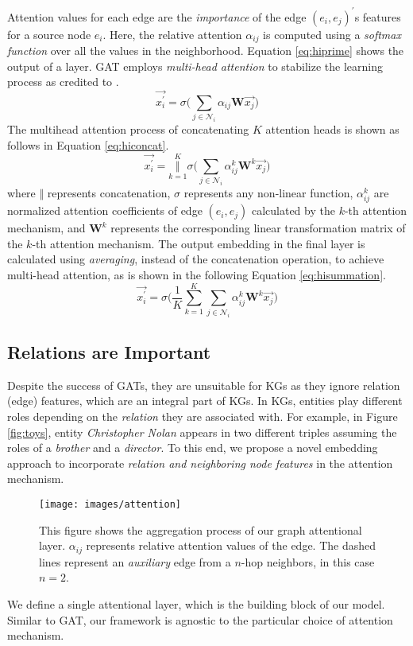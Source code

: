 \documentclass[11pt,a4paper]{article}
\begin{document}
Attention values for each edge are the \textit{importance} of the edge \((e_i, e_j)^{'}\)s features for a source node \(e_i\). Here, the relative attention \(\alpha_{ij}\) is computed using a \emph{softmax function} over all the values in the neighborhood.
Equation \ref{eq:hiprime} shows the output of a layer. GAT employs \emph{multi-head attention} to stabilize the learning process as credited to \cite{NIPS2017_7181}. 
\begin{equation}\label{eq:hiprime}
\vec{x_{i}^{\prime}} = \sigma \Bigg( \sum_{j \in \mathcal{N}_{i}} \alpha_{ij} \textbf{W} \vec{x_{j}} \Bigg)
\end{equation}
The multihead attention process of concatenating $K$ attention heads is shown as follows in Equation \ref{eq:hiconcat}. 
\begin{equation}\label{eq:hiconcat}
 \vec{x_{i}^{\prime}} = \underset{k=1}{\stackrel{K}{\Big \Vert}}  \sigma \Bigg( \sum_{j \in \mathcal{N}_{i}} \alpha_{ij}^{k} \textbf{W}^{k} \vec{x_{j}} \Bigg)
\end{equation}
where $\Vert$ represents concatenation, \(\sigma\) represents any non-linear function, $\alpha_{ij}^{k}$ are normalized attention coefficients of edge \((e_i, e_j)\) calculated by the $k$-th attention mechanism, and \(\textbf{W}^k\) represents the corresponding linear transformation matrix of the \(k\)-th 
attention mechanism.
The output embedding in the final layer is calculated using \emph{averaging}, instead of the concatenation operation, to achieve multi-head attention, as is shown in the following Equation \ref{eq:hisummation}.
\begin{equation}\label{eq:hisummation}
 \vec{x_{i}^{\prime}} =   \sigma \Bigg(\frac{1}{K}\sum_{k = 1}^{K}\sum_{j \in \mathcal{N}_{i}} \alpha_{ij}^{k} \textbf{W}^{k} \vec{x_{j}} \Bigg)
\end{equation}

\subsection{Relations are Important}
Despite the success of GATs, they are unsuitable for KGs as they ignore relation (edge) features, which are an 
integral part of KGs. In KGs, entities play different roles depending on the \emph{relation} they are associated with.
For example, in Figure \ref{fig:toys}, entity \textit{Christopher Nolan} appears in two different triples assuming the roles of a
\emph{brother} and a \emph{director}. To this end, we propose a novel embedding approach to incorporate \textit{relation and neighboring node features} in the attention mechanism.
\begin{figure}
  \texttt{[image: images/attention]}
  \caption{This figure shows the aggregation process of our graph attentional layer. \(\alpha_{ij}\) represents relative attention values of the edge. 
The dashed lines represent an \textit{auxiliary} edge from a $n$-hop neighbors, in this case $n = 2$. }
  \label{fig:attentionex}
\end{figure}
We define a single attentional layer, which is the building block of our model. Similar to GAT, our framework is agnostic to the particular choice of attention mechanism.
\end{document}
